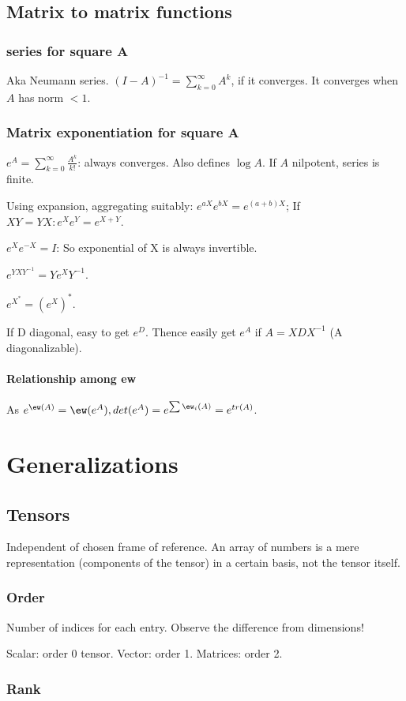 \documentclass[oneside, article]{memoir}
\begin{document}
\chapter{Matrix to matrix functions}
\section{ series for square A}
Aka Neumann series. $(I-A)^{-1} = \sum_{k=0}^{\infty} A^{k}$, if it converges. It converges when $A$ has norm $<1$.

\section{Matrix exponentiation for square A}
$e^{A} = \sum_{k=0}^{\infty} \frac{A^{k}}{k!}$: always converges. Also defines $\log A$. If $A$ nilpotent, series is finite.

Using expansion, aggregating suitably: $e^{aX}e^{bX} = e^{(a+b)X}$; If $XY=YX: e^{X}e^{Y} = e^{X+Y}$.

$e^{X}e^{-X} = I$: So exponential of X is always invertible.

$e^{YXY^{-1}} = Ye^{X}Y^{-1}$.

$e^{X^{*}} = (e^{X})^{*}$.

If D diagonal, easy to get $e^{D}$. Thence easily get $e^{A}$ if $A = XDX^{-1}$ (A diagonalizable).

\subsection{Relationship among ew}
As $e^{\ew(A)} = \ew(e^{A}), det(e^{A}) = e^{\sum \ew_{i}(A)} = e^{tr(A)}$.


\part{Generalizations}
\chapter{Tensors}
Independent of chosen frame of reference. An array of numbers is a mere representation (components of the tensor) in a certain basis, not the tensor itself.

\section{Order}
Number of indices for each entry. Observe the difference from dimensions!

Scalar: order 0 tensor. Vector: order 1. Matrices: order 2.

\section{Rank}
\tbc



\end{document}
